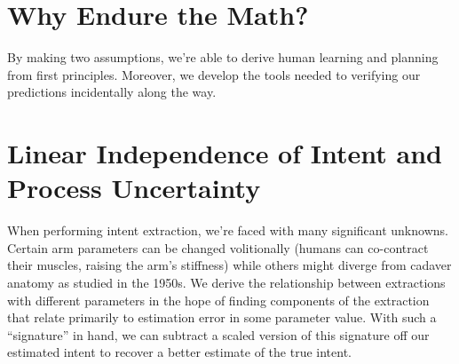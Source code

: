 \documentclass[10pt]{article}
\begin{document}
\section*{Why Endure the Math?}
By making two assumptions, we're able to derive human learning and planning from first principles. Moreover, we develop the tools needed to verifying our predictions incidentally along the way.

\section*{Linear Independence of Intent and Process Uncertainty}
When performing intent extraction, we're faced with many significant unknowns. Certain arm parameters can be changed volitionally (humans can co-contract their muscles, raising the arm's stiffness) while others might diverge from cadaver anatomy as studied in the 1950s. We derive the relationship between extractions with different parameters in the hope of finding components of the extraction that relate primarily to estimation error in some parameter value. With such a ``signature'' in hand, we can subtract a scaled version of this signature off our estimated intent to recover a better estimate of the true intent.
\end{document}
